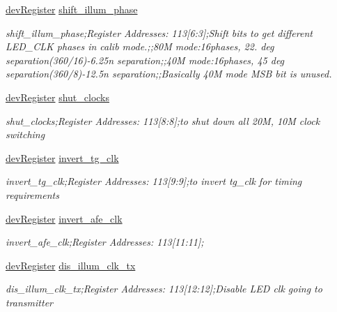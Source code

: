 \begin{DoxyCompactItemize}
\mbox{\hyperlink{classdev_register}{dev\+Register}} \mbox{\hyperlink{class_o_p_t3101_registers_a94ac086d5f7e663c6dc7c3593cac3b5e}{shift\+\_\+illum\+\_\+phase}}
\begin{DoxyCompactList}\small\item\em shift\+\_\+illum\+\_\+phase;Register Addresses\+: 113\mbox{[}6\+:3\mbox{]};Shift bits to get different L\+E\+D\+\_\+\+C\+LK phases in calib mode.;;80M mode\+:16phases, 22. deg separation(360/16)-\/6.\+25n separation;;40M mode\+:16phases, 45 deg separation(360/8)-\/12.\+5n separation;;Basically 40M mode M\+SB bit is unused. \end{DoxyCompactList}\item 
\mbox{\hyperlink{classdev_register}{dev\+Register}} \mbox{\hyperlink{class_o_p_t3101_registers_aa12f0d2acddcb5fec5486679efc32b9e}{shut\+\_\+clocks}}
\begin{DoxyCompactList}\small\item\em shut\+\_\+clocks;Register Addresses\+: 113\mbox{[}8\+:8\mbox{]};to shut down all 20M, 10M clock switching \end{DoxyCompactList}\item 
\mbox{\hyperlink{classdev_register}{dev\+Register}} \mbox{\hyperlink{class_o_p_t3101_registers_aafc537a35dddb705d93afc3cf2987691}{invert\+\_\+tg\+\_\+clk}}
\begin{DoxyCompactList}\small\item\em invert\+\_\+tg\+\_\+clk;Register Addresses\+: 113\mbox{[}9\+:9\mbox{]};to invert tg\+\_\+clk for timing requirements \end{DoxyCompactList}\item 
\mbox{\hyperlink{classdev_register}{dev\+Register}} \mbox{\hyperlink{class_o_p_t3101_registers_a31f537a5f1f92a24f07e2fef2ba4db72}{invert\+\_\+afe\+\_\+clk}}
\begin{DoxyCompactList}\small\item\em invert\+\_\+afe\+\_\+clk;Register Addresses\+: 113\mbox{[}11\+:11\mbox{]}; \end{DoxyCompactList}\item 
\mbox{\hyperlink{classdev_register}{dev\+Register}} \mbox{\hyperlink{class_o_p_t3101_registers_ade489a95c33bc2c8ffe2752b08c961d4}{dis\+\_\+illum\+\_\+clk\+\_\+tx}}
\begin{DoxyCompactList}\small\item\em dis\+\_\+illum\+\_\+clk\+\_\+tx;Register Addresses\+: 113\mbox{[}12\+:12\mbox{]};Disable L\+ED clk going to transmitter \end{DoxyCompactList}\item 

\end{DoxyCompactItemize}
